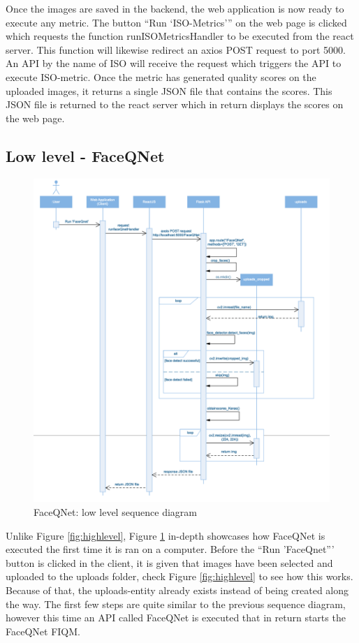 Once the images are saved in the backend, the web application is now ready to execute any metric. The button ``Run `ISO-Metrics''' on the web page is clicked which requests the function runISOMetricsHandler to be executed from the react server. This function will likewise redirect an axios POST request to port 5000. An API by the name of ISO will receive the request which triggers the API to execute ISO-metric. Once the metric has generated quality scores on the uploaded images, it returns a single JSON file that contains the scores. This JSON file is returned to the react server which in return displays the scores on the web page. 
\newpage

\subsection{Low level - FaceQNet}

\begin{figure}[h]
    \centering
    \includegraphics[scale = 0.65]{figures/LowLevel.png}
    \caption{FaceQNet: low level sequence diagram}
    \label{fig:lowlevel}
\end{figure}

Unlike Figure \ref{fig:highlevel}, Figure \ref{fig:lowlevel} in-depth showcases how FaceQNet is executed the first time it is ran on a computer. Before the ``Run 'FaceQnet''' button is clicked in the client, it is given that images have been selected and uploaded to the uploads folder, check Figure \ref{fig:highlevel} to see how this works. Because of that, the uploads-entity already exists instead of being created along the way. The first few steps are quite similar to the previous sequence diagram, however this time an API called FaceQNet is executed that in return starts the FaceQNet FIQM. 
\newpage

